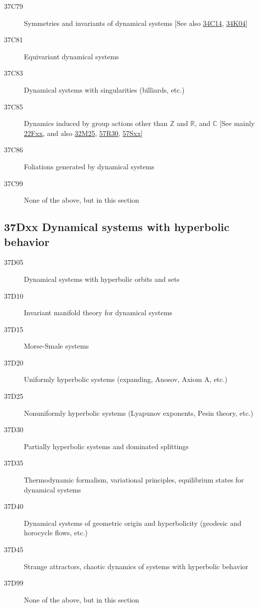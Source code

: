 \begin{description}
\item [37C79]\label{37C79} Symmetries and invariants of dynamical systems [See also \hyperref[34C14]{34C14}, \hyperref[34K04]{34K04}]
\item [37C81]\label{37C81} Equivariant dynamical systems
\item [37C83]\label{37C83} Dynamical systems with singularities (billiards, etc.)
\item [37C85]\label{37C85} Dynamics induced by group actions other than $\mathbb{Z}$ and $\mathbb{R}$, and $\mathbb{C}$ [See mainly \hyperref[22Fxx]{22Fxx}, and also \hyperref[32M25]{32M25}, \hyperref[57R30]{57R30}, \hyperref[57Sxx]{57Sxx}]
\item [37C86]\label{37C86} Foliations generated by dynamical systems
\item [37C99]\label{37C99} None of the above, but in this section
\end{description}
\subsection*{37Dxx  Dynamical systems with hyperbolic behavior }\label{37Dxx}
\begin{description}  
\item [37D05]\label{37D05} Dynamical systems with hyperbolic orbits and sets
\item [37D10]\label{37D10} Invariant manifold theory for dynamical systems
\item [37D15]\label{37D15} Morse-Smale systems
\item [37D20]\label{37D20} Uniformly hyperbolic systems (expanding, Anosov, Axiom A, etc.)
\item [37D25]\label{37D25} Nonuniformly hyperbolic systems (Lyapunov exponents, Pesin theory, etc.)
\item [37D30]\label{37D30} Partially hyperbolic systems and dominated splittings
\item [37D35]\label{37D35}  Thermodynamic formalism, variational principles, equilibrium states for dynamical systems
\item [37D40]\label{37D40} Dynamical systems of geometric origin and hyperbolicity (geodesic and horocycle flows, etc.)
\item [37D45]\label{37D45} Strange attractors, chaotic dynamics of systems with hyperbolic behavior
\item [37D99]\label{37D99} None of the above, but in this section
\end{description}
